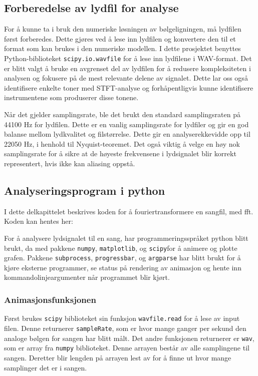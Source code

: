 \subsection{Forberedelse av lydfil for analyse}
For å kunne ta i bruk den numeriske løsningen av bølgeligningen, må lydfilen først forberedes. Dette gjøres ved å lese inn lydfilen 
og konvertere den til et format som kan brukes i den numeriske modellen. I dette prosjektet benyttes Python-biblioteket 
\verb|scipy.io.wavfile| for å lese inn lydfilene i WAV-format. Det er blitt valgt å bruke en avgrenset del av lydfilen for å redusere kompleksiteten
i analysen og fokusere på de mest relevante delene av signalet. Dette lar oss også identifisere enkelte toner med STFT-analyse og forhåpentligvis kunne
identifisere instrumentene som produserer disse tonene.

Når det gjelder samplingsrate, ble det brukt den standard samplingsraten på 44100 Hz for lydfilen. Dette er en vanlig samplingsrate for 
lydfiler og gir en god balanse mellom lydkvalitet og filstørrelse. Dette gir en analyserekkevidde opp til 22050 Hz, i henhold til Nyquist-teoremet.
Det også viktig å velge en høy nok samplingsrate for å sikre at de høyeste frekvensene i lydsignalet blir korrekt representert, hvis ikke kan aliasing oppstå.

\subsection{Analyseringsprogram i python}

I dette delkapittelet beskrives koden for å fouriertransformere en sangfil, med fft. Koden kan hentes her: 
\parencite{python_fft_analyse} 

For å analysere lydsignalet til en sang, har programmeringsspråket python blitt brukt, da med
pakkene \texttt{numpy}, \texttt{matplotlib}, og \texttt{scipy}for å animere og plotte grafen. 
Pakkene \texttt{subprocess}, \texttt{progressbar}, og \texttt{argparse} har blitt brukt for 
å kjøre eksterne programmer, se status på rendering av animasjon og hente inn kommandolinjeargumenter når
programmet blir kjørt. 

\subsubsection{Animasjonsfunksjonen}

Først brukes \texttt{scipy} biblioteket sin funksjon \texttt{wavfile.read} for å lese av input filen.
Denne returnerer \texttt{sampleRate}, som er hvor mange ganger per sekund den analoge bølgen for 
sangen har blitt målt. Det andre funksjonen returnerer er \texttt{wav}, som er array fra 
\texttt{numpy} biblioteket. Denne arrayen består av alle samplingene til sangen. Deretter blir
lengden på arrayen lest av for å finne ut hvor mange samplinger det er i sangen. 

